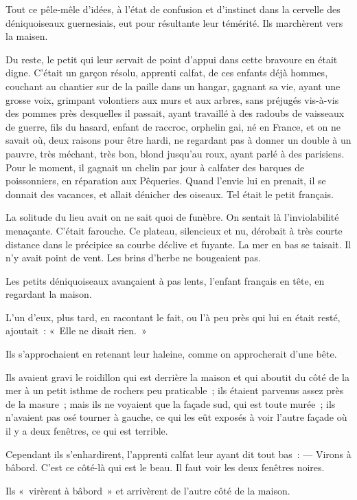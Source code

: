 \documentclass[french,twoside]{book} %
\begin{document}
Tout ce pêle-mêle d’idées, à l’état de confusion et d’instinct dans la cervelle des déniquoiseaux guernesiais, eut pour résultante leur témérité. Ils marchèrent vers la maisen.\par
Du reste, le petit qui leur servait de point d’appui dans cette bravoure en était digne. C’était un garçon résolu, apprenti calfat, de ces enfants déjà hommes, couchant au chantier sur de la paille dans un hangar, gagnant sa vie, ayant une grosse voix, grimpant volontiers aux murs et aux arbres, sans préjugés vis-à-vis des pommes près desquelles il passait, ayant travaillé à des radoubs de vaisseaux de guerre, fils du hasard, enfant de raccroc, orphelin gai, né en France, et on ne savait où, deux raisons pour être hardi, ne regardant pas à donner un double à un pauvre, très méchant, très bon, blond jusqu’au roux, ayant parlé à des parisiens. Pour le moment, il gagnait un chelin par jour à calfater des barques de poissonniers, en réparation aux Pêqueries. Quand l’envie lui en prenait,  il se donnait des vacances, et allait dénicher des oiseaux. Tel était le petit français.\par
La solitude du lieu avait on ne sait quoi de funèbre. On sentait là l’inviolabilité menaçante. C’était farouche. Ce plateau, silencieux et nu, dérobait à très courte distance dans le précipice sa courbe déclive et fuyante. La mer en bas se taisait. Il n’y avait point de vent. Les brins d’herbe ne bougeaient pas.\par
Les petits déniquoiseaux avançaient à pas lents, l’enfant français en tête, en regardant la maison.\par
L’un d’eux, plus tard, en racontant le fait, ou l’à peu près qui lui en était resté, ajoutait : « Elle ne disait rien. »\par
Ils s’approchaient en retenant leur haleine, comme on approcherait d’une bête.\par
Ils avaient gravi le roidillon qui est derrière la maison et qui aboutit du côté de la mer à un petit isthme de rochers peu praticable ; ils étaient parvenus assez près de la masure ; mais ils ne voyaient que la façade sud, qui est toute murée ; ils n’avaient pas osé tourner à gauche, ce qui les eût exposés à voir l’autre façade où il y a deux fenêtres, ce qui est terrible.\par
Cependant ils s’enhardirent, l’apprenti calfat leur ayant dit tout bas : — Virons à bâbord. C’est ce côté-là qui est le beau. Il faut voir les deux fenêtres noires.\par
Ils « virèrent à bâbord » et arrivèrent de l’autre côté de la maison.\par
\end{document}
